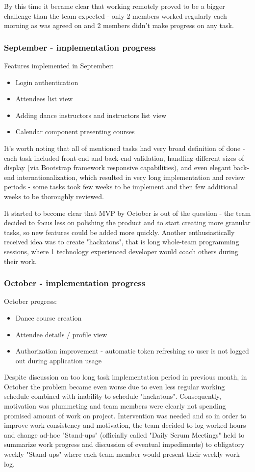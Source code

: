 \documentclass{article}
\begin{document}
By this time it became clear that working remotely proved to be a bigger challenge than the team expected - only 2 members worked regularly each morning as was agreed on and 2 members didn't make progress on any task.

\subsubsection{September - implementation progress}
Features implemented in September:
\begin{itemize}
\item Login authentication
\item Attendees list view
\item Adding dance instructors and instructors list view
\item Calendar component presenting courses
\end{itemize}
It's worth noting that all of mentioned tasks had very broad definition of done - each task included front-end and back-end validation, handling different sizes of display (via Bootstrap framework responsive capabilities), and even elegant back-end internationalization, which resulted in very long implementation and review periods - some tasks took few weeks to be implement and then few additional weeks to be thoroughly reviewed.

It started to become clear that MVP by October is out of the question - the team decided to focus less on polishing the product and to start creating more granular tasks, so new features could be added more quickly. Another enthusiastically received idea was to create "hackatons", that is long whole-team programming sessions, where 1 technology experienced developer would coach others during their work.

\subsubsection{October - implementation progress}
October progress:
\begin{itemize}
\item Dance course creation
\item Attendee details / profile view
\item Authorization improvement - automatic token refreshing so user is not logged out during application usage
\end{itemize}

Despite discussion on too long task implementation period in previous month, in October the problem became even worse due to even less regular working schedule combined with inability to schedule "hackatons". Consequently, motivation was plummeting and team members were clearly not spending promised amount of work on project. Intervention was needed and so in order to improve work consistency and motivation, the team decided to log worked hours and change ad-hoc "Stand-ups" (officially called "Daily Scrum Meetings" held to summarize work progress and discussion of eventual impediments) to obligatory weekly "Stand-ups" where each team member would present their weekly work log.
\end{document}

